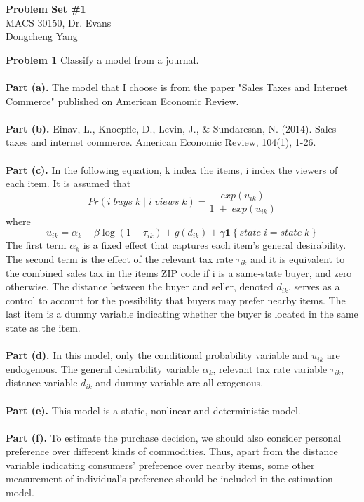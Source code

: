 \documentclass[letterpaper,12pt]{article}
\theoremstyle{definition}
\begin{document}
\begin{flushleft}
  \textbf{\large{Problem Set \#1}} \\
  MACS 30150, Dr. Evans \\
  Dongcheng Yang
\end{flushleft}

\vspace{5mm}

\noindent\textbf{Problem 1}
Classify a model from a journal.
~\\
~\\
\noindent\textbf{Part (a).} The model that I choose is from the paper "Sales Taxes and Internet Commerce" published on American Economic Review.
~\\
~\\
\noindent\textbf{Part (b).} Einav, L., Knoepfle, D., Levin, J., & Sundaresan, N. (2014). Sales taxes and internet commerce. American Economic Review, 104(1), 1-26.
~\\
~\\
\noindent\textbf{Part (c).}
In the following equation, k index the items, i index the viewers of each item. It is assumed that 
\begin{equation*}
  Pr\left(i\;buys\;k\;|\;i\;views\;k\right)  =  \frac{exp\left(u_{ik}\right)}{1\;+\; exp\left(u_{ik}\right)}
\end{equation*}
where
\begin{equation*}
u_{ik} = \alpha_{k} + \beta\log\left(1+\tau_{ik}\right) + g\left(d_{ik}\right) + \gamma\mathbf{1}\left\{state\;i = state\;k\right\}
\end{equation*}
The first term $\alpha_{k}$ is a fixed effect that captures each item's general desirability. The second term is the effect of the relevant tax rate $\tau_{ik}$ and it is equivalent to the combined sales tax in the items ZIP code if i is a same-state buyer, and zero otherwise. The distance between the buyer and seller, denoted $d_{ik}$, serves as a control to account for the possibility that buyers may prefer nearby items. The last item is a dummy variable indicating whether the buyer is located in the same state as the item.
~\\
~\\
\noindent\textbf{Part (d).}
In this model, only the conditional probability variable and $u_{ik}$ are endogenous. The general desirability variable $\alpha_{k}$, relevant tax rate variable $\tau_{ik}$, distance variable $d_{ik}$ and dummy variable are all exogenous. 
~\\
~\\
\noindent\textbf{Part (e).} 
This model is a static, nonlinear and deterministic model.
~\\
~\\
\noindent\textbf{Part (f).}
To estimate the purchase decision, we should also consider personal preference over different kinds of commodities. Thus, apart from the distance variable indicating consumers' preference over nearby items, some other measurement of individual's preference should be included in the estimation model. 
\end{document}
